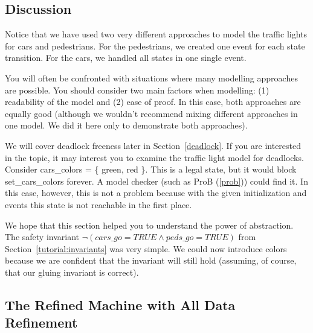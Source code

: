 
\subsection{Discussion}
\label{tut_concepts_discussion}

Notice that we have used two very different approaches to model the traffic lights for cars and pedestrians.  For the pedestrians, we created one event for each state transition.  For the cars, we handled all states in one single event.

You will often be confronted with situations where many modelling approaches are possible.  You should consider two main factors when modelling: (1) readability of the model and (2) ease of proof.  In this case, both approaches are equally good (although we wouldn't recommend mixing different approaches in one model. We did it here only to demonstrate both approaches).

We will cover deadlock freeness later in Section~\ref{deadlock}.  If you are interested in the topic, it may interest you to examine the traffic light model for deadlocks.  Consider \textsf{cars\_colors = \{ green, red \}}. This is a legal state, but it would block \textsf{set\_cars\_colors} forever.  A model checker (such as ProB (\ref{prob})) could find it.  In this case, however, this is not a problem because with the given initialization and events this state is not reachable in the first place.

We hope that this section helped you to understand the power of abstraction.  The safety invariant
$\lnot(cars\_go = TRUE \land peds\_go = TRUE)$ from Section~\ref{tutorial:invariants} was very simple.  We could now introduce colors because we are confident that the invariant will still hold (assuming, of course, that our gluing invariant is correct).

\subsection{The Refined Machine with All Data Refinement}

